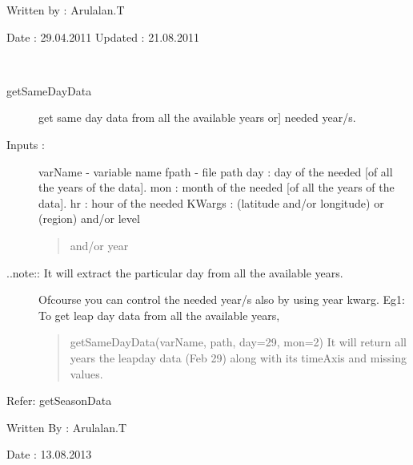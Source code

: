 \documentclass[letterpaper,10pt,english]{sphinxmanual}
\begin{document}
\begin{fulllineitems}
\begin{fulllineitems}
\begin{description}
\begin{description}
\end{description}

\end{description}

Written by : Arulalan.T

Date : 29.04.2011
Updated : 21.08.2011

\end{fulllineitems}


\begin{fulllineitems}
\label{diagnosisutils:xml_data_access.TimeUtility.getSameDayData}~\begin{description}
\item[{getSameDayData}] \leavevmode{[}get same day data from all the available years or{]}
needed year/s.

\item[{Inputs :}] \leavevmode
varName - variable name
fpath - file path
day : day of the needed  {[}of all the years of the data{]}.
mon : month of the needed {[}of all the years of the data{]}.
hr : hour of the needed
KWargs : (latitude and/or longitude) or (region) and/or level
\begin{quote}

and/or year
\end{quote}

\item[{..note:: It will extract the particular day from all the available years.}] \leavevmode
Ofcourse you can control the needed year/s also by using year kwarg.
Eg1: To get leap day data from all the available years,
\begin{quote}

getSameDayData(varName, path, day=29, mon=2)
It will return all years the leapday data (Feb 29) along with
its timeAxis and missing values.
\end{quote}

\end{description}

Refer: getSeasonData

Written By : Arulalan.T

Date : 13.08.2013

\end{fulllineitems}



\end{fulllineitems}
\end{document}

